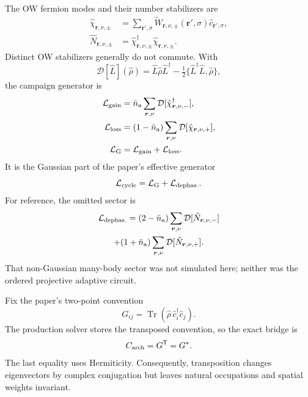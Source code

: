 \documentclass[aps,prb,twocolumn,nofootinbib,superscriptaddress,floatfix]{revtex4-2}
\newcommand{\Tr}{\operatorname{Tr}}
\newcommand{\Diss}{\mathcal{D}}
\begin{document}
The OW fermion modes and their number stabilizers are
\begin{align}
 \hat\chi_{\boldsymbol r,\nu,\pm}
 &=\sum_{\boldsymbol r',\sigma}
 \widetilde W_{\boldsymbol r,\nu,\pm}(\boldsymbol r',\sigma)
 \hat c_{\boldsymbol r',\sigma},\nonumber\\
 \hat N_{\boldsymbol r,\nu,\pm}
 &=\hat\chi_{\boldsymbol r,\nu,\pm}^\dagger
 \hat\chi_{\boldsymbol r,\nu,\pm}.
 \label{eq:owoperators}
\end{align}
Distinct OW stabilizers generally do not commute. With
\begin{equation}
 \Diss[\hat L](\hat\rho)=\hat L\hat\rho\hat L^\dagger
 -\tfrac12\{\hat L^\dagger\hat L,\hat\rho\},
\end{equation}
the campaign generator is
\begin{align}
 \mathcal L_{\rm gain}&=\bar n_{\rm a}
 \sum_{\boldsymbol r,\nu}\Diss[
 \hat\chi_{\boldsymbol r,\nu,-}^\dagger],\nonumber\\
 \mathcal L_{\rm loss}&=(1-\bar n_{\rm a})
 \sum_{\boldsymbol r,\nu}\Diss[
 \hat\chi_{\boldsymbol r,\nu,+}],\nonumber\\
 \mathcal L_{\rm G}&=\mathcal L_{\rm gain}+\mathcal L_{\rm loss}.
 \label{eq:LG}
\end{align}
It is the Gaussian part of the paper's effective generator
\begin{equation}
 \mathcal L_{\rm cycle}=\mathcal L_{\rm G}
 +\mathcal L_{\rm dephas.}.
 \label{eq:Lcycle}
\end{equation}
For reference, the omitted sector is
\begin{multline}
 \mathcal L_{\rm dephas.}=(2-\bar n_{\rm a})
 \sum_{\boldsymbol r,\nu}\Diss[\hat N_{\boldsymbol r,\nu,-}]\\
 +(1+\bar n_{\rm a})
 \sum_{\boldsymbol r,\nu}\Diss[\hat N_{\boldsymbol r,\nu,+}].
 \label{eq:omitteddephasing}
\end{multline}
That non-Gaussian many-body sector was not simulated here; neither was the
ordered projective adaptive circuit.

Fix the paper's two-point convention
\begin{equation}
 G_{ij}=\Tr(\hat\rho\,\hat c_i^\dagger\hat c_j).
 \label{eq:corrdef}
\end{equation}
The production solver stores the transposed convention, so the exact bridge is
\begin{equation}
 C_{\rm arch}=G^{\mathsf T}=G^*.
 \label{eq:archivemap}
\end{equation}
The last equality uses Hermiticity. Consequently, transposition changes
eigenvectors by complex conjugation but leaves natural occupations and spatial
weights invariant.
\end{document}
